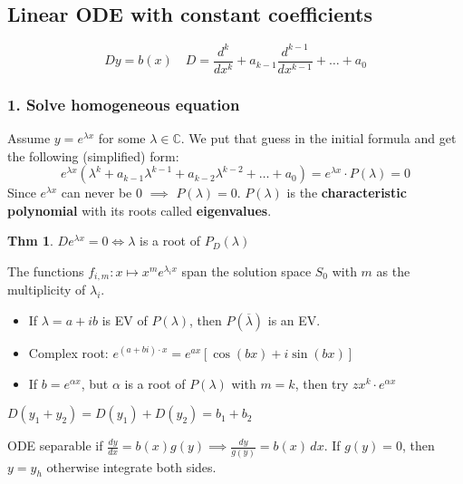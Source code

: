 \documentclass[a4paper, 10pt]{article}
\theoremstyle{definition}
\newtheorem*{theorem}{Thm}
\newcommand{\C}{\mathbb{C}}
\begin{document}
\subsection{Linear ODE with constant coefficients}
\[Dy = b(x) \quad D = \frac{d^k}{dx^k} + a_{k - 1} \frac{d^{k-1}}{dx^{k-1}} + \ldots + a_0\]

\subsubsection*{1. Solve homogeneous equation}
Assume \(y = e^{\lambda x}\) for some \(\lambda \in \C\). We put that guess in the initial formula and get the following (simplified) form:
\[e^{\lambda x}(\lambda^k + a_{k-1}\lambda^{k-1} + a_{k-2}\lambda^{k-2} + \ldots + a_0) = e^{\lambda x} \cdot P(\lambda) = 0\]
Since \(e^{\lambda x}\) can never be \(0\) \(\implies\) \(P(\lambda) = 0\). \(P(\lambda)\) is the \textbf{characteristic polynomial} with its roots called \textbf{eigenvalues}.

\begin{theorem}
    \(D e^{\lambda x} = 0 \iff \lambda\) is a root of \(P_D(\lambda)\)
\end{theorem}

\begin{note*}[Solutions]
    The functions \(f_{i, m}: x \mapsto x^m e^{\lambda_i x}\) span the solution space \(S_0\) with \(m\) as the multiplicity of \(\lambda_i\).

    \begin{itemize}
        \item If \(\lambda = a + ib\) is EV of \(P(\lambda)\), then \(P(\overline{\lambda})\) is an EV.
        \item Complex root: \(e^{(a + bi) \cdot x} = e^{ax}[\cos(bx) + i \sin(bx)]\)
        \item If \(b = e^{\alpha x}\), but \(\alpha\) is a root of \(P(\lambda)\) with \(m = k\), then try \(zx^k \cdot e^{\alpha x}\)
    \end{itemize}
\end{note*}

\begin{ntheorem*}
    \(D(y_1 + y_2) = D(y_1) + D(y_2) = b_1 + b_2\)
\end{ntheorem*}

\begin{ntheorem*}
    ODE separable if \(\frac{dy}{dx} = b(x)g(y) \implies \frac{dy}{g(y)} = b(x) \,dx\). If \(g(y) = 0\), then \(y = y_h\) otherwise integrate both sides.
\end{ntheorem*}
\end{document}
